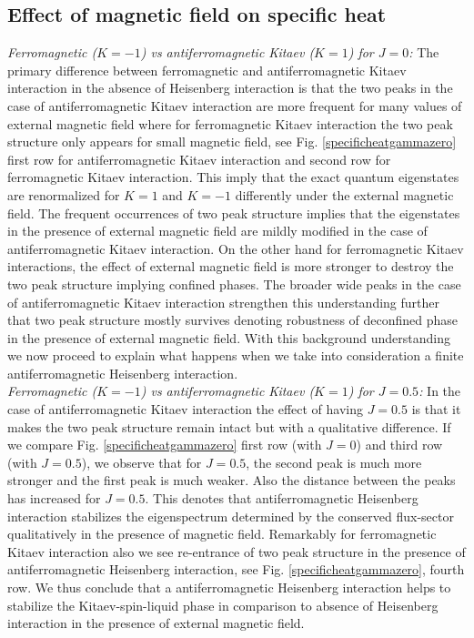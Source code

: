 \documentclass[aps,amsmath,twocolumn,amssymb,floatfix,showpacs,superscriptaddress,nofootinbib,longbibliography]{revtex4-1}
\begin{document}
\subsection{Effect of magnetic field on specific heat}
\indent
{\it \small{Ferromagnetic ($K=-1$) vs antiferromagnetic Kitaev ($K=1$) for $J=0$:}} The primary difference between
ferromagnetic and antiferromagnetic Kitaev interaction in the absence of Heisenberg interaction is that the two peaks in the case of antiferromagnetic Kitaev interaction are more frequent for many values of external magnetic field where for ferromagnetic Kitaev interaction the two peak structure only appears for small magnetic field, see Fig. \ref{specificheatgammazero} first row for antiferromagnetic Kitaev interaction and second row for ferromagnetic Kitaev interaction. This imply that the exact quantum eigenstates are renormalized for $K=1$ and $K=-1$ differently under the external magnetic field. The frequent occurrences of two peak structure implies that the eigenstates in the presence of external magnetic field are mildly modified in the case of antiferromagnetic Kitaev interaction. On the other hand for ferromagnetic Kitaev interactions, the effect of external magnetic field is more stronger to destroy the two peak structure implying confined phases. The broader wide peaks in the case of antiferromagnetic Kitaev interaction strengthen this understanding further that two peak structure mostly survives denoting robustness of deconfined phase in the presence of external magnetic field. With this  background understanding we now proceed to explain what happens when we take into consideration a finite antiferromagnetic Heisenberg interaction. \\
\indent
{\it \small{Ferromagnetic ($K=-1$) vs antiferromagnetic Kitaev ($K=1$) for $J=0.5$:}} In the case of antiferromagnetic Kitaev interaction the effect of having $J=0.5$ is that it makes the two peak structure
remain intact but with a  qualitative difference. If we compare Fig. \ref{specificheatgammazero} first row
(with $J=0$) and third row (with $J=0.5$), we observe that for $J=0.5$, the second peak is much more stronger
and the first peak is much weaker. Also the distance between the peaks has increased for $J=0.5$. This denotes
that antiferromagnetic Heisenberg interaction stabilizes the eigenspectrum determined by the conserved flux-sector qualitatively in the presence of magnetic field. Remarkably for ferromagnetic Kitaev interaction also we see re-entrance of two peak structure in the presence of antiferromagnetic Heisenberg interaction, see Fig. \ref{specificheatgammazero}, fourth row. We thus conclude that a antiferromagnetic Heisenberg interaction helps to stabilize the Kitaev-spin-liquid phase in comparison to absence of Heisenberg interaction in the presence of external magnetic field. \\
\end{document}

